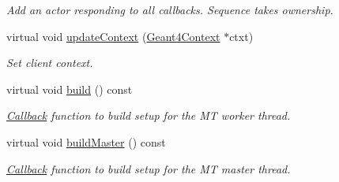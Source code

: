 \begin{DoxyCompactItemize}
\begin{DoxyCompactList}\small\item\em Add an actor responding to all callbacks. Sequence takes ownership. \item\end{DoxyCompactList}\item 
virtual void \hyperlink{class_d_d4hep_1_1_simulation_1_1_geant4_user_initialization_sequence_ae73630ce8b3759e3793dc58f585a291b}{updateContext} (\hyperlink{class_d_d4hep_1_1_simulation_1_1_geant4_context}{Geant4Context} $\ast$ctxt)
\begin{DoxyCompactList}\small\item\em Set client context. \item\end{DoxyCompactList}\item 
virtual void \hyperlink{class_d_d4hep_1_1_simulation_1_1_geant4_user_initialization_sequence_a2c9eb901f2697c8f9ba428b49b7252ac}{build} () const 
\begin{DoxyCompactList}\small\item\em \hyperlink{class_d_d4hep_1_1_callback}{Callback} function to build setup for the MT worker thread. \item\end{DoxyCompactList}\item 
virtual void \hyperlink{class_d_d4hep_1_1_simulation_1_1_geant4_user_initialization_sequence_aec8d9a6016af25e06531351ba0f49418}{buildMaster} () const 
\begin{DoxyCompactList}\small\item\em \hyperlink{class_d_d4hep_1_1_callback}{Callback} function to build setup for the MT master thread. \item\end{DoxyCompactList}\end{DoxyCompactItemize}
